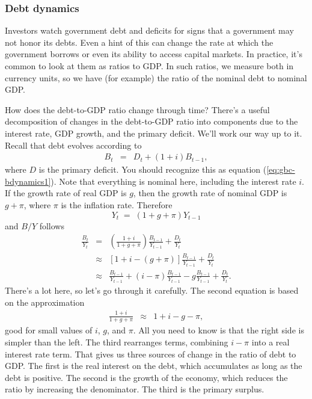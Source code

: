\documentclass[letterpaper,12pt]{article}
\begin{document}
\subsubsection*{Debt dynamics}

Investors watch government debt and deficits
for signs that a government may not honor its debts.
Even a hint of this can change the rate at which the government
borrows or even its ability to access capital markets.
In practice, it's common to look at them as ratios to GDP.
In such ratios, we measure both in currency units,
so we have (for example)
the ratio of the nominal debt to nominal GDP.


How does the debt-to-GDP ratio change through time?
There's a useful decomposition of changes in the debt-to-GDP ratio
into components due to the interest rate, GDP growth, and the
primary deficit.
We'll work our way up to it.
Recall that debt evolves according to
\begin{eqnarray*}
    B_{t} &=& D_t + (1+i) B_{t-1}  ,
\end{eqnarray*}
where $D$ is the primary deficit.
You should recognize this as equation (\ref{eq:gbc-bdynamics1}).
Note that everything is nominal here, including the interest rate $i$.
If the growth rate of real GDP is $g$, then the growth rate
of nominal GDP is $g + \pi$, where $\pi$ is the inflation rate.
Therefore
\[
    Y_{t} \;=\; (1+g+\pi) Y_{t-1}
\]
and $B/Y$ follows
\begin{eqnarray}
    \frac{B_{t}}{Y_{t}}
            &=&
                \left( \frac{1+i}{1+g+\pi} \right)  \frac{B_{t-1}}{Y_{t-1}}
             +    \frac{D_{t}}{Y_{t}}  \nonumber \\
            &\approx&
                \left[ 1 + i - (g+\pi) \right]  \frac{B_{t-1}}{Y_{t-1}}
             +    \frac{D_{t}}{Y_{t}}   \nonumber \\
            &\approx&
                \frac{B_{t-1}}{Y_{t-1}} + (i-\pi) \frac{B_{t-1}}{Y_{t-1}}
                - g \frac{B_{t-1}}{Y_{t-1}}
             +    \frac{D_{t}}{Y_{t}}  .
    \label{eq:debtdynamics}
\end{eqnarray}
There's a lot here, so let's go through it carefully.
The second equation is based on the approximation
\begin{eqnarray*}
    \frac{1+i}{1+g+\pi} &\approx& 1 + i - g - \pi ,
\end{eqnarray*}
good for small values of $i$, $g$, and $\pi$.
All you need to know is that the right side is simpler than the left.
The third rearranges terms, combining $i-\pi$ into a real
interest rate term.
That gives us three sources
of change in the ratio of debt to GDP.
The first is the real interest on the debt, which accumulates
as long as the debt is positive.
The second is the growth of the economy,
which reduces the ratio by increasing the denominator.
The third is the primary surplus.
\end{document}
